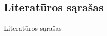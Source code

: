 \begin{center}
    \section*{Literatūros sąrašas}
    
\end{center}
{Literatūros sąrašas}

\printbibliography[heading=none]


% 
% 


\newpage